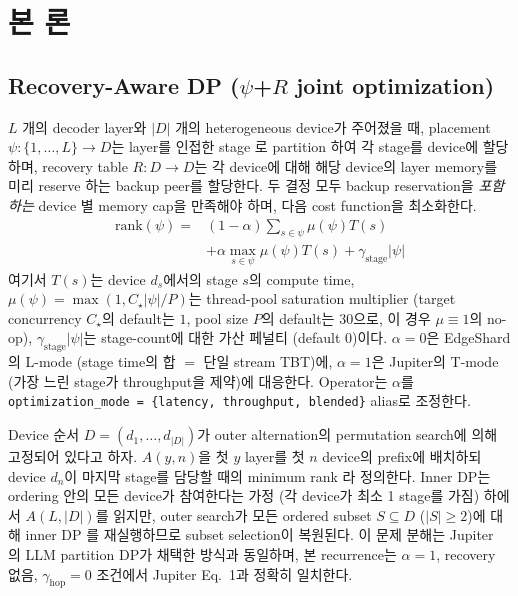 \documentclass[10pt,twocolumn,a4paper]{article}
\begin{document}
\section{본  론}

\subsection{Recovery-Aware DP (\texorpdfstring{$\psi$+$R$}{psi+R} joint optimization)}

$L$ 개의 decoder layer와 $|D|$ 개의 heterogeneous device가 주어졌을
때, placement $\psi: \{1,\ldots,L\} \to D$는 layer를 인접한 stage
로 partition 하여 각 stage를 device에 할당하며, recovery table
$R: D \to D$는 각 device에 대해 해당 device의 layer memory를
미리 reserve 하는 backup peer를 할당한다. 두 결정 모두 backup
reservation을 \emph{포함하는} device 별 memory cap을 만족해야 하며,
다음 cost function을 최소화한다.
\begin{equation}\label{eq:rank}
\begin{aligned}
  \mathrm{rank}(\psi) ={} & (1{-}\alpha) \sum_{s \in \psi} \mu(\psi) T(s) \\
                          & + \alpha \max_{s \in \psi} \mu(\psi) T(s)
                            + \gamma_{\mathrm{stage}} |\psi|
\end{aligned}
\end{equation}
여기서 $T(s)$는 device $d_s$에서의 stage $s$의 compute time,
$\mu(\psi) = \max(1, C_\star |\psi| / P)$는 thread-pool
saturation multiplier (target concurrency $C_\star$의 default는 $1$,
pool size $P$의 default는 $30$으로, 이 경우 $\mu \equiv 1$의 no-op),
$\gamma_{\mathrm{stage}} |\psi|$는 stage-count에 대한 가산 페널티
(default $0$)이다. $\alpha\!=\!0$은 EdgeShard의 L-mode
(stage time의 합 $=$ 단일 stream TBT)에, $\alpha\!=\!1$은 Jupiter의
T-mode (가장 느린 stage가 throughput을 제약)에 대응한다.
Operator는 $\alpha$를
\texttt{optimization\_mode = \{latency, throughput, blended\}} alias로
조정한다.

Device 순서 $D = (d_1, \ldots, d_{|D|})$가 outer alternation의
permutation search에 의해 고정되어 있다고 하자. $A(y, n)$을 첫 $y$
layer를 첫 $n$ device의 prefix에 배치하되 device $d_n$이
마지막 stage를 담당할 때의 minimum rank 라 정의한다. Inner DP는
ordering 안의 모든 device가 참여한다는 가정 (각 device가 최소
1 stage를 가짐) 하에서 $A(L, |D|)$를 읽지만, outer search가
모든 ordered subset $S \subseteq D$ ($|S| \geq 2$)에 대해 inner DP
를 재실행하므로 subset selection이 복원된다. 이 문제 분해는 Jupiter~\cite{ye2025jupiter}
의 LLM partition DP가 채택한 방식과 동일하며, 본 recurrence는
$\alpha\!=\!1$, recovery 없음, $\gamma_{\mathrm{hop}}\!=\!0$ 조건에서
Jupiter Eq.~1과 정확히 일치한다.
\end{document}
